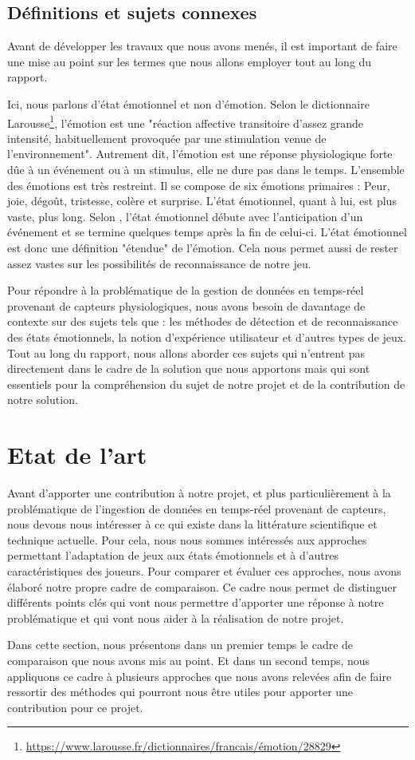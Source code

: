 \documentclass[11pt]{article}
\begin{document}
	\subsection{Définitions et sujets connexes}\label{sec:connexe}
		Avant de développer les travaux que nous avons menés, il est important de faire une mise au point sur les termes que nous allons employer tout au long du rapport.\par
		Ici, nous parlons d'état émotionnel et non d'émotion.
		Selon le dictionnaire Larousse\footnote{\href{https://www.larousse.fr/dictionnaires/francais/émotion/28829}{https://www.larousse.fr/dictionnaires/francais/émotion/28829}}, l'émotion est une "réaction affective transitoire d'assez grande intensité, habituellement provoquée par une stimulation venue de l'environnement". 
		Autrement dit, l'émotion est une réponse physiologique forte dûe à un événement ou à un stimulus, elle ne dure pas dans le temps.
		L'ensemble des émotions est très restreint.
		Il se compose de six émotions primaires : Peur, joie, dégoût, tristesse, colère et surprise. 
		L'état émotionnel, quant à lui, est plus vaste, plus long.
		Selon \cite{gal_2019}, l'état émotionnel débute avec l'anticipation d'un événement et se termine quelques temps après la fin de celui-ci.
		L'état émotionnel est donc une définition "étendue" de l'émotion.
		Cela nous permet aussi de rester assez vastes sur les possibilités de reconnaissance de notre jeu.\par
		Pour répondre à la problématique de la gestion de données en temps-réel provenant de capteurs physiologiques, nous avons besoin de davantage de contexte sur des sujets tels que : les méthodes de détection et de reconnaissance des états émotionnels, la notion d'expérience utilisateur et d'autres types de jeux.
		Tout au long du rapport, nous allons aborder ces sujets qui n'entrent pas directement dans le cadre de la solution que nous apportons mais qui sont essentiels pour la compréhension du sujet de notre projet et de la contribution de notre solution.

\section{Etat de l'art}\label{sec:eda}
	Avant d'apporter une contribution à notre projet, et plus particulièrement à la problématique de l'ingestion de données en temps-réel provenant de capteurs, nous devons nous intéresser à ce qui existe dans la littérature scientifique et technique actuelle. 
	Pour cela, nous nous sommes intéressés aux approches permettant l'adaptation de jeux aux états émotionnels et à d'autres caractéristiques des joueurs.
	Pour comparer et évaluer ces approches, nous avons élaboré notre propre cadre de comparaison.
	Ce cadre nous permet de distinguer différents points clés qui vont nous permettre d'apporter une réponse à notre problématique et qui vont nous aider à la réalisation de notre projet.\par
	Dans cette section, nous présentons dans un premier temps le cadre de comparaison que nous avons mis au point.
	Et dans un second temps, nous appliquons ce cadre à plusieurs approches que nous avons relevées afin de faire ressortir des méthodes qui pourront nous être utiles pour apporter une contribution pour ce projet.
\end{document}
